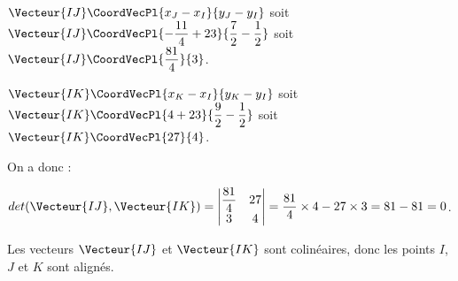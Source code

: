 \documentclass[a4paper]{article}
\begin{document}
\begin{exercice}{}{}
\begin{enumerate}
      $\Vecteur{IJ}\CoordVecPl{x_J-x_I}{y_J-y_I}$ soit $\Vecteur{IJ}\CoordVecPl{-\dfrac{11}{4}+23}{\dfrac{7}{2}-\dfrac{1}{2}}$ soit $\Vecteur{IJ}\CoordVecPl{\dfrac{81}{4}}{3}$.  

      $\Vecteur{IK}\CoordVecPl{x_K-x_I}{y_K-y_I}$ soit $\Vecteur{IK}\CoordVecPl{4+23}{\dfrac{9}{2}-\dfrac{1}{2}}$ soit $\Vecteur{IK}\CoordVecPl{27}{4}$.

      On a donc : 
      
      $det(\Vecteur{IJ},\Vecteur{IK})=\begin{vmatrix}
        \dfrac{81}{4} & 27\\
        3 & 4
      \end{vmatrix} = \dfrac{81}{4} \times 4 - 27 \times 3 = 81 - 81 = 0$.

      Les vecteurs $\Vecteur{IJ}$ et $\Vecteur{IK}$ sont colinéaires, donc les points $I$, $J$ et $K$ sont alignés.


    \end{enumerate}
  \end{exercice}
\end{document}
